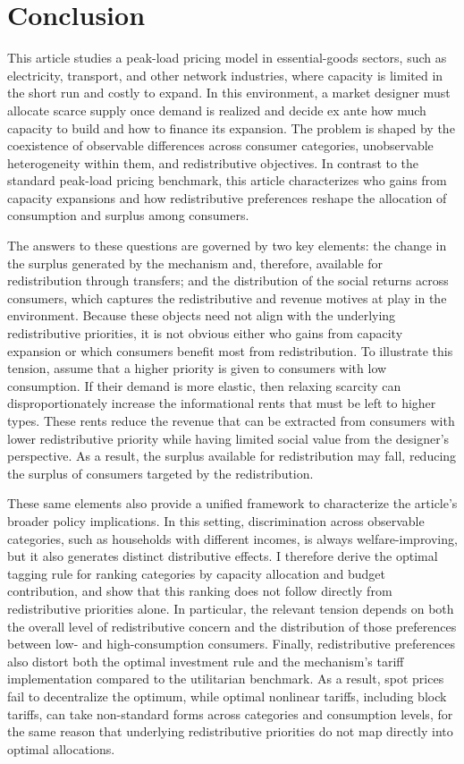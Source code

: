 \documentclass{class}
\begin{document}
\section{Conclusion}

This article studies a peak-load pricing model in essential-goods sectors, such as electricity, transport, and other network industries, where capacity is limited in the short run and costly to expand. In this environment, a market designer must allocate scarce supply once demand is realized and decide ex ante how much capacity to build and how to finance its expansion. The problem is shaped by the coexistence of observable differences across consumer categories, unobservable heterogeneity within them, and redistributive objectives. In contrast to the standard peak-load pricing benchmark, this article characterizes who gains from capacity expansions and how redistributive preferences reshape the allocation of consumption and surplus among consumers.

The answers to these questions are governed by two key elements: the change in the surplus generated by the mechanism and, therefore, available for redistribution through transfers; and the distribution of the social returns across consumers, which captures the redistributive and revenue motives at play in the environment. Because these objects need not align with the underlying redistributive priorities, it is not obvious either who gains from capacity expansion or which consumers benefit most from redistribution. To illustrate this tension, assume that a higher priority is given to consumers with low consumption. If their demand is more elastic, then relaxing scarcity can disproportionately increase the informational rents that must be left to higher types. These rents reduce the revenue that can be extracted from consumers with lower redistributive priority while having limited social value from the designer’s perspective. As a result, the surplus available for redistribution may fall, reducing the surplus of consumers targeted by the redistribution.

These same elements also provide a unified framework to characterize the article’s broader policy implications. In this setting, discrimination across observable categories, such as households with different incomes, is always welfare-improving, but it also generates distinct distributive effects. I therefore derive the optimal tagging rule for ranking categories by capacity allocation and budget contribution, and show that this ranking does not follow directly from redistributive priorities alone. In particular, the relevant tension depends on both the overall level of redistributive concern and the distribution of those preferences between low- and high-consumption consumers. Finally, redistributive preferences also distort both the optimal investment rule and the mechanism's tariff implementation compared to the utilitarian benchmark. As a result, spot prices fail to decentralize the optimum, while optimal nonlinear tariffs, including block tariffs, can take non-standard forms across categories and consumption levels, for the same reason that underlying redistributive priorities do not map directly into optimal allocations.
\end{document}
